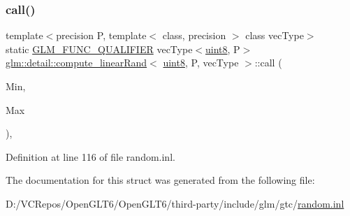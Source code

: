 \subsubsection{\texorpdfstring{call()}{call()}}
{\footnotesize\ttfamily template$<$precision P, template$<$ class, precision $>$ class vec\+Type$>$ \\
static \mbox{\hyperlink{setup_8hpp_a33fdea6f91c5f834105f7415e2a64407}{G\+L\+M\+\_\+\+F\+U\+N\+C\+\_\+\+Q\+U\+A\+L\+I\+F\+I\+ER}} vec\+Type$<$\mbox{\hyperlink{namespaceglm_1_1detail_aef2588f97d090cc19fbbe0c74fe17c8f}{uint8}}, P$>$ \mbox{\hyperlink{structglm_1_1detail_1_1compute__linear_rand}{glm\+::detail\+::compute\+\_\+linear\+Rand}}$<$ \mbox{\hyperlink{namespaceglm_1_1detail_aef2588f97d090cc19fbbe0c74fe17c8f}{uint8}}, P, vec\+Type $>$\+::call (\begin{DoxyParamCaption}\item[{vec\+Type$<$ \mbox{\hyperlink{namespaceglm_1_1detail_aef2588f97d090cc19fbbe0c74fe17c8f}{uint8}}, P $>$ const \&}]{Min,  }\item[{vec\+Type$<$ \mbox{\hyperlink{namespaceglm_1_1detail_aef2588f97d090cc19fbbe0c74fe17c8f}{uint8}}, P $>$ const \&}]{Max }\end{DoxyParamCaption})\hspace{0.3cm}{\ttfamily [inline]}, {\ttfamily [static]}}



Definition at line 116 of file random.\+inl.



The documentation for this struct was generated from the following file\+:\begin{DoxyCompactItemize}
\item 
D\+:/\+V\+C\+Repos/\+Open\+G\+L\+T6/\+Open\+G\+L\+T6/third-\/party/include/glm/gtc/\mbox{\hyperlink{random_8inl}{random.\+inl}}\end{DoxyCompactItemize}
